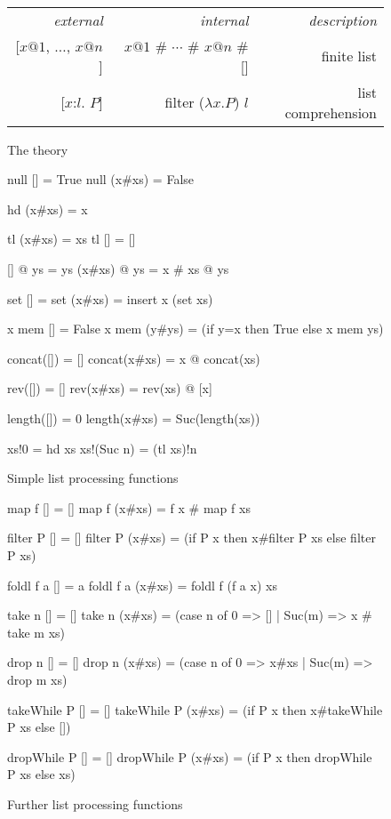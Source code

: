 \begin{figure}
\begin{center} \tt\frenchspacing
\begin{tabular}{rrr} 
  \it external        & \it internal  & \it description \\{}
  [$x@1$, $\dots$, $x@n$]  &  $x@1$ \# $\cdots$ \# $x@n$ \# [] &
        \rm finite list \\{}
  [$x$:$l$. $P$]  & filter ($\lambda x{.}P$) $l$ & 
        \rm list comprehension
\end{tabular}
\end{center}
\caption{The theory } \label{hol-list}
\end{figure}


\begin{figure}
\begin{ttbox}\makeatother
null [] = True
null (x#xs) = False

hd (x#xs) = x

tl (x#xs) = xs
tl [] = []

[] @ ys = ys
(x#xs) @ ys = x # xs @ ys

set [] = \ttlbrace\ttrbrace
set (x#xs) = insert x (set xs)

x mem [] = False
x mem (y#ys) = (if y=x then True else x mem ys)

concat([]) = []
concat(x#xs) = x @ concat(xs)

rev([]) = []
rev(x#xs) = rev(xs) @ [x]

length([]) = 0
length(x#xs) = Suc(length(xs))

xs!0 = hd xs
xs!(Suc n) = (tl xs)!n
\end{ttbox}
\caption{Simple list processing functions}
\label{fig:HOL:list-simps}
\end{figure}

\begin{figure}
\begin{ttbox}\makeatother
map f [] = []
map f (x#xs) = f x # map f xs

filter P [] = []
filter P (x#xs) = (if P x then x#filter P xs else filter P xs)

foldl f a [] = a
foldl f a (x#xs) = foldl f (f a x) xs

take n [] = []
take n (x#xs) = (case n of 0 => [] | Suc(m) => x # take m xs)

drop n [] = []
drop n (x#xs) = (case n of 0 => x#xs | Suc(m) => drop m xs)

takeWhile P [] = []
takeWhile P (x#xs) = (if P x then x#takeWhile P xs else [])

dropWhile P [] = []
dropWhile P (x#xs) = (if P x then dropWhile P xs else xs)
\end{ttbox}
\caption{Further list processing functions}
\label{fig:HOL:list-simps2}
\end{figure}


